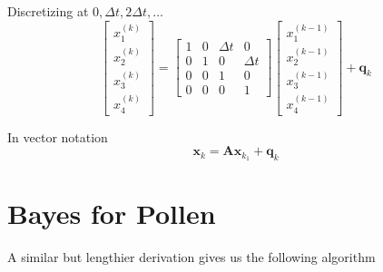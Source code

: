 \documentclass[presentation]{beamer}
\begin{document}
\begin{frame}{}

  \begin{block}{Discretizing at $0, \Delta t, 2\Delta t, \ldots $}
    $$
    \begin{bmatrix}x^{(k)}_1 \\ x^{(k)}_2 \\ x^{(k)}_3 \\ x^{(k)}_4\end{bmatrix} =
    \begin{bmatrix}
      1 & 0 & \Delta t & 0 \\
      0 & 1 & 0        & \Delta t \\
      0 & 0 & 1        & 0 \\
      0 & 0 & 0        & 1
    \end{bmatrix}
    \begin{bmatrix}x^{(k-1)}_1 \\ x^{(k-1)}_2 \\ x^{(k-1)}_3 \\ x^{(k-1)}_4\end{bmatrix} +
    \mathbf{q}_k
    $$
  \end{block}

  \begin{block}{In vector notation}
    $$
    \mathbf{x}_k = \mathbf{A} \mathbf{x}_{k_1} + \mathbf{q}_k
    $$
  \end{block}

\end{frame}

\section{Bayes for Pollen}

\begin{frame}{}

  A similar but lengthier derivation gives us the following algorithm

\end{frame}
\end{document}
